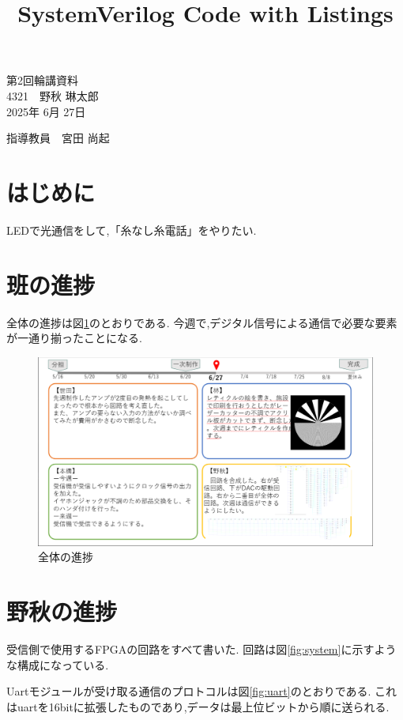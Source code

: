 \documentclass[a4paper,10pt]{article}
\title{SystemVerilog Code with Listings}
\begin{document}
\begin{center}
\noindent
{\LARGE 第2回輪講資料} \\
{\large 4321　野秋 琳太郎} \\
2025年 6月 27日
\end{center}

\begin{flushright}
指導教員　宮田 尚起
\end{flushright}

\begin{multicols}{2}

\section{はじめに}
LEDで光通信をして,「糸なし糸電話」をやりたい.

\section{班の進捗}
全体の進捗は図\ref{fig:block}のとおりである.
今週で,デジタル信号による通信で必要な要素が一通り揃ったことになる.

\begin{figure}[H] %
  \centering
  \includegraphics[width=\linewidth]{sintyoku.png}
  \caption{全体の進捗}
  \label{fig:block}
\end{figure}

\section{野秋の進捗}
受信側で使用するFPGAの回路をすべて書いた.
回路は図\ref{fig:system}に示すような構成になっている.

Uartモジュールが受け取る通信のプロトコルは図\ref{fig:uart}のとおりである.
これはuartを16bitに拡張したものであり,データは最上位ビットから順に送られる.


\end{multicols}
\end{document}
